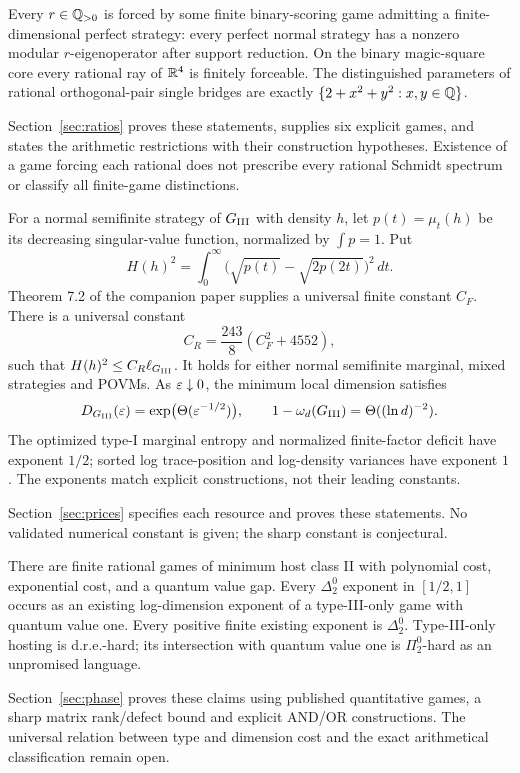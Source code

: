 \begin{theorem}\label{thm:ratio-summary}
Every $r\in\mathbb Q_{>0}$ is forced by some finite binary-scoring game admitting a finite-dimensional perfect strategy: every perfect normal strategy has a nonzero modular $r$-eigenoperator after support reduction. On the binary magic-square core every rational ray of $\mathbb R^4$ is finitely forceable. The distinguished parameters of rational orthogonal-pair single bridges are exactly $\{2+x^2+y^2:x,y\in\mathbb Q\}$.
\end{theorem}
Section~\ref{sec:ratios} proves these statements, supplies six explicit games, and states the arithmetic restrictions with their construction hypotheses. Existence of a game forcing each rational does not prescribe every rational Schmidt spectrum or classify all finite-game distinctions.

\begin{theorem}\label{thm:price}
For a normal semifinite strategy of $G_{\mathrm{III}}$ with density $h$, let $p(t)=\mu_t(h)$ be its decreasing singular-value function, normalized by $\int p=1$. Put
\[
 H(h)^2=\int_0^\infty\bigl(\sqrt{p(t)}-\sqrt{2p(2t)}\bigr)^2\,dt.
\]
Theorem 7.2 of the companion paper \cite{Base} supplies a universal finite constant $C_F$. There is a universal constant
\[
 C_R=\frac{243}{8}(C_F^2+4552),
\]
such that $H(h)^2\le C_R\ell_{G_{\mathrm{III}}}$. It holds for either normal semifinite marginal, mixed strategies and POVMs. As $\varepsilon\downarrow0$, the minimum local dimension satisfies
\[
 D_{G_{\mathrm{III}}}(\varepsilon)=\exp\bigl(\Theta(\varepsilon^{-1/2})\bigr),\qquad
 1-\omega_d(G_{\mathrm{III}})=\Theta((\ln d)^{-2}).
\]
The optimized type-I marginal entropy and normalized finite-factor deficit have exponent $1/2$; sorted log trace-position and log-density variances have exponent $1$. The exponents match explicit constructions, not their leading constants.
\end{theorem}
Section~\ref{sec:prices} specifies each resource and proves these statements. No validated numerical constant is given; the sharp constant is conjectural.

\begin{theorem}\label{thm:phase-summary}
There are finite rational games of minimum host class II with polynomial cost, exponential cost, and a quantum value gap. Every $\Delta^0_2$ exponent in $[1/2,1]$ occurs as an existing log-dimension exponent of a type-III-only game with quantum value one. Every positive finite existing exponent is $\Delta^0_2$. Type-III-only hosting is d.r.e.-hard; its intersection with quantum value one is $\Pi^0_2$-hard as an unpromised language.
\end{theorem}
Section~\ref{sec:phase} proves these claims using published quantitative games, a sharp matrix rank/defect bound and explicit AND/OR constructions. The universal relation between type and dimension cost and the exact arithmetical classification remain open.

